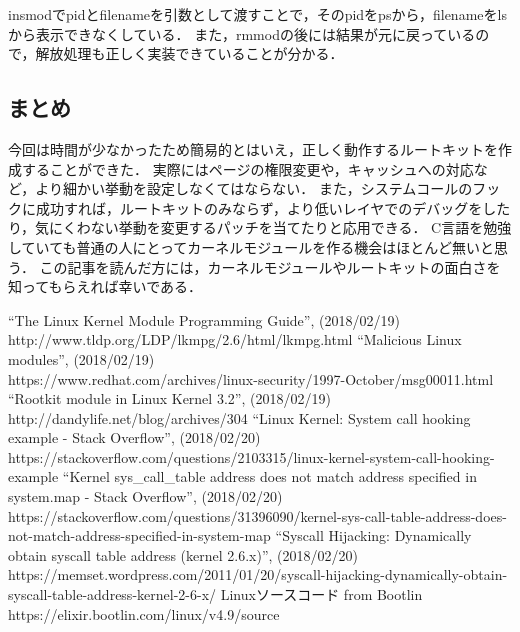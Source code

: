\documentclass{jsarticle}
\begin{document}
  insmodでpidとfilenameを引数として渡すことで，そのpidをpsから，filenameをlsから表示できなくしている．
  また，rmmodの後には結果が元に戻っているので，解放処理も正しく実装できていることが分かる．

  \subsection{まとめ}
  今回は時間が少なかったため簡易的とはいえ，正しく動作するルートキットを作成することができた．
  実際にはページの権限変更や，キャッシュへの対応など，より細かい挙動を設定しなくてはならない．
  また，システムコールのフックに成功すれば，ルートキットのみならず，より低いレイヤでのデバッグをしたり，気にくわない挙動を変更するパッチを当てたりと応用できる．
  C言語を勉強していても普通の人にとってカーネルモジュールを作る機会はほとんど無いと思う．
  この記事を読んだ方には，カーネルモジュールやルートキットの面白さを知ってもらえれば幸いである．

  \begin{thebibliography}{99}
   ``The Linux Kernel Module Programming Guide'', (2018/02/19)\\
    http://www.tldp.org/LDP/lkmpg/2.6/html/lkmpg.html
   ``Malicious Linux modules'', (2018/02/19)\\
    https://www.redhat.com/archives/linux-security/1997-October/msg00011.html
   ``Rootkit module in Linux Kernel 3.2'', (2018/02/19)\\
    http://dandylife.net/blog/archives/304
   ``Linux Kernel: System call hooking example - Stack Overflow'', (2018/02/20)\\
    https://stackoverflow.com/questions/2103315/linux-kernel-system-call-hooking-example
   ``Kernel sys\_call\_table address does not match address specified in system.map - Stack Overflow'', (2018/02/20)\\
    https://stackoverflow.com/questions/31396090/kernel-sys-call-table-address-does-not-match-address-specified-in-system-map
   ``Syscall Hijacking: Dynamically obtain syscall table address (kernel 2.6.x)'', (2018/02/20)\\
    https://memset.wordpress.com/2011/01/20/syscall-hijacking-dynamically-obtain-syscall-table-address-kernel-2-6-x/
   Linuxソースコード from Bootlin\\
    https://elixir.bootlin.com/linux/v4.9/source
  \end{thebibliography}
\end{document}
